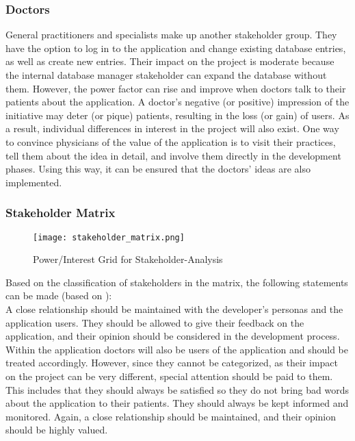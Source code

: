 \subsubsection{Doctors}
General practitioners and specialists make up another stakeholder group. They have the option to log in to the application and change existing database entries, as well as create new entries. Their impact on the project is moderate because the internal database manager stakeholder can expand the database without them. However, the power factor can rise and improve when doctors talk to their patients about the application. A doctor's negative (or positive) impression of the initiative may deter (or pique) patients, resulting in the loss (or gain) of users. As a result, individual differences in interest in the project will also exist. One way to convince physicians of the value of the application is to visit their practices, tell them about the idea in detail, and involve them directly in the development phases. Using this way, it can be ensured that the doctors' ideas are also implemented.
\subsubsection{Stakeholder Matrix}
\begin{figure}[H]
	\centering
	\texttt{[image: stakeholder\_matrix.png]}
	\caption[Power/Interest Grid for Stakeholder-Analysis ]{Power/Interest Grid for Stakeholder-Analysis}
\end{figure}
\noindent	
Based on the classification of stakeholders in the matrix, the following statements can be made (based on \cite{.stakes}):
\newline \\
A close relationship should be maintained with the developer's personas and the application users. They should be allowed to give their feedback on the application, and their opinion should be considered in the development process.
\newline \\ 
Within the application doctors will also be users of the application and should be treated accordingly. However, since they cannot be categorized, as their impact on the project can be very different, special attention should be paid to them. This includes that they should always be satisfied so they do not bring bad words about the application to their patients. They should always be kept informed and monitored. Again, a close relationship should be maintained, and their opinion should be highly valued.
